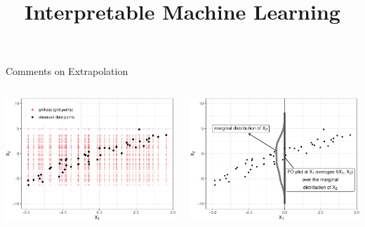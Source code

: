 \documentclass[10pt,compress,t,notes=noshow, xcolor=table]{beamer}
\title{Interpretable Machine Learning}
\date{}
\begin{document}


\begin{frame}{Comments on Extrapolation}

 
\begin{columns}[T, totalwidth=\textwidth]
\begin{column}{0.5\textwidth}
\centering
\includegraphics[width=\textwidth]{figure/ale_scatter_grid}
\end{column}
\begin{column}{0.5\textwidth}
\centering
\includegraphics[width=\textwidth]{figure/ale_pdplot}
\end{column}
\end{columns}


\end{frame}
\end{document}
